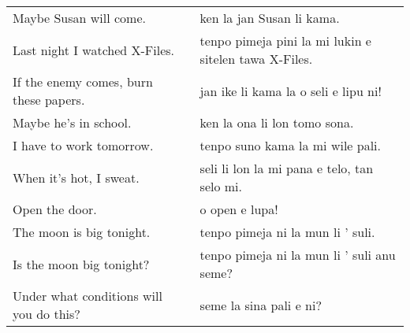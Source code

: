 \begin{supertabular}{p{5,5cm}|ll}
    Maybe Susan will come.                  &  & ken la jan Susan li kama.                             \\ %
    Last night I watched X-Files.           &  & tenpo pimeja pini la mi lukin e sitelen tawa X-Files. \\ %
    If the enemy comes, burn these papers.  &  & jan ike li kama la o seli e lipu ni!                  \\ %
    Maybe he's in school.                   &  & ken la ona li lon tomo sona.                          \\ %
    I have to work tomorrow.                &  & tenpo suno kama la mi wile pali.                      \\ %
    When it's hot, I sweat.                 &  & seli li lon la mi pana e telo, tan selo mi.           \\ %
    Open the door.                          &  & o open e lupa!                                        \\ %
    The moon is big tonight.                &  & tenpo pimeja ni la mun li ' suli.                     \\ %
    Is the moon big tonight?                &  & tenpo pimeja ni la mun li ' suli anu seme?            \\ %
    Under what conditions will you do this? &  & seme la sina pali e ni?                               \\ %
\end{supertabular}

